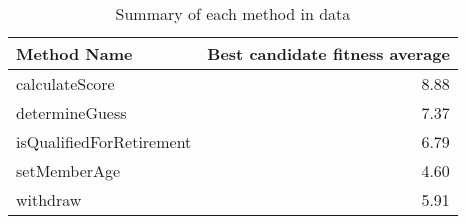 \begin{table}[ht]
\centering
\begin{tabular}{lr}
  \hline
Method Name & Best candidate fitness average \\ 
  \hline
calculateScore & 8.88 \\ 
  determineGuess & 7.37 \\ 
  isQualifiedForRetirement & 6.79 \\ 
  setMemberAge & 4.60 \\ 
  withdraw & 5.91 \\ 
   \hline
\end{tabular}
\caption{Summary of each method in data} 
\label{table:each_method_summary 2}
\end{table}
